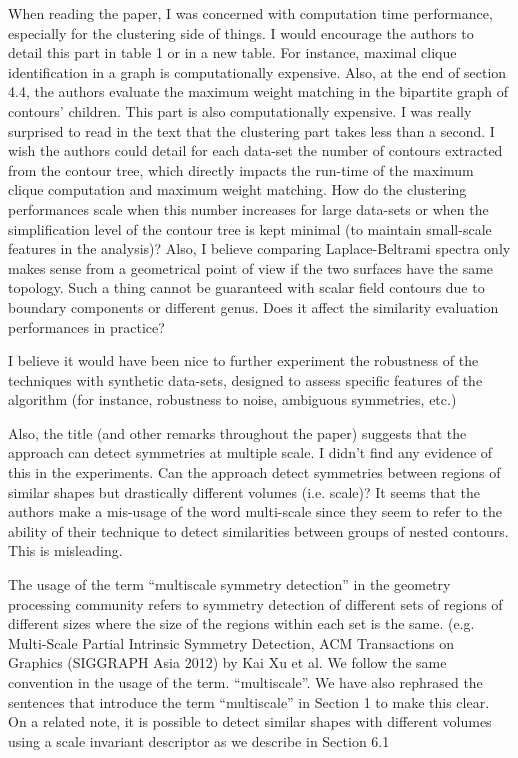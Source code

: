 \documentclass[10pt]{article}
\begin{document}
   When reading the paper, I was concerned with computation time
   performance, especially for the clustering side of things. I would
   encourage the authors to detail this part in table 1 or in a new table.
   For instance, maximal clique identification in a graph is computationally
   expensive. Also, at the end of section 4.4, the authors evaluate the
   maximum weight matching in the bipartite graph of contours' children.
   This part is also computationally expensive. I was really surprised to
   read in the text that the clustering part takes less than a 
   second. I wish the authors could detail for each data-set the number of 
   contours extracted from the contour tree, which directly impacts the
   run-time of the maximum clique computation and maximum weight matching.
   How do the clustering performances scale when this number increases for
   large data-sets or when the simplification level of the contour tree is
   kept minimal (to maintain small-scale features in the analysis)?
   Also, I believe comparing Laplace-Beltrami spectra only makes sense from
   a geometrical point of view if the two surfaces have the same topology.
   Such a thing cannot be guaranteed with scalar field contours due to
   boundary components or different genus. Does it affect the similarity
   evaluation performances in practice?

   I believe it would have been nice to further experiment the robustness of
   the techniques with synthetic data-sets, designed to assess specific
   features of the algorithm (for instance, robustness to noise, ambiguous
   symmetries, etc.)

   Also, the title (and other remarks throughout the paper) suggests that
   the approach can detect symmetries at multiple scale. I didn't find any
   evidence of this in the experiments. Can the approach detect symmetries
   between regions of similar shapes but drastically different volumes (i.e.
   scale)?
   It seems that the authors make a mis-usage of the word multi-scale since
   they seem to refer to the ability of their technique to detect
   similarities between groups of nested contours. This is misleading.

   {\color{blue}The usage of the term ``multiscale symmetry detection'' in
	   the geometry processing community refers to symmetry detection of
	   different sets of regions of different sizes where the size of the regions
	   within each set is the same. (e.g. Multi-Scale Partial Intrinsic Symmetry Detection,
   ACM Transactions on Graphics (SIGGRAPH Asia 2012) by Kai Xu et al.
   We follow the same convention in the usage of the term. ``multiscale''.
   We have also rephrased the sentences that introduce the term ``multiscale''
   in Section 1 to make this clear. On a related note, it is possible to
   detect similar shapes with different volumes using a scale invariant descriptor  as we describe in Section 6.1}\\
   
\end{document}
